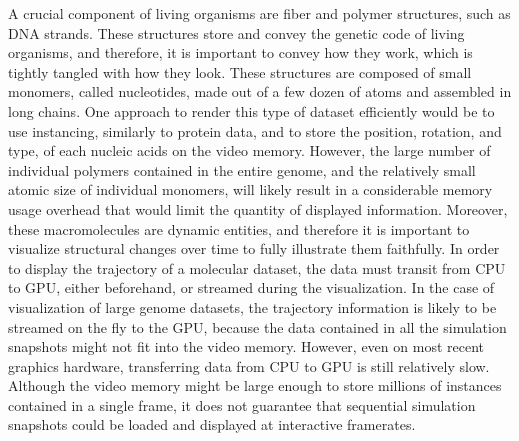 A crucial component of living organisms are fiber and polymer structures, such as DNA strands.
These structures store and convey the genetic code of living organisms, and therefore, it is important to convey how they work, which is tightly tangled with how they look.
These structures are composed of small monomers, called nucleotides, made out of a few dozen of atoms and assembled in long chains.
One approach to render this type of dataset efficiently would be to use instancing, similarly to protein data, and to store the position, rotation, and type, of each nucleic acids on the video memory.
However, the large number of individual polymers contained in the entire genome, and the relatively small atomic size of individual monomers, will likely result in a considerable memory usage overhead that would limit the quantity of displayed information.
%
Moreover, these macromolecules are dynamic entities, and therefore it is important to visualize structural changes over time to fully illustrate them faithfully.
In order to display the trajectory of a molecular dataset, the data must transit from CPU to GPU, either beforehand, or streamed during the visualization.
In the case of visualization of large genome datasets, the trajectory information is likely to be streamed on the fly to the GPU, because the data contained in all the simulation snapshots might not fit into the video memory.
However, even on most recent graphics hardware, transferring data from CPU to GPU is still relatively slow.
Although the video memory might be large enough to store millions of instances contained in a single frame, it does not guarantee that sequential simulation snapshots could be loaded and displayed at interactive framerates.

